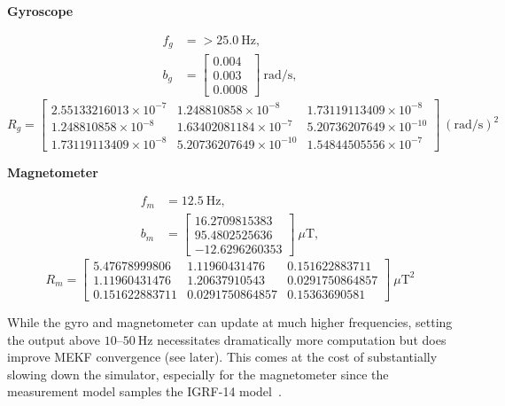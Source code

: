 \documentclass[conference,onecolumn,draftclsnofoot]{IEEEtran}
\begin{document}
\begin{center}
\textbf{Gyroscope}
\end{center}
\begin{align}
f_g &= > 25.0~\mathrm{Hz}, \\
b_g &=
\begin{bmatrix}
0.004 \\
0.003 \\
0.0008
\end{bmatrix}
~\mathrm{rad/s},
\end{align}
\begin{equation}
R_g =
\begin{bmatrix}
2.55133216013\times 10^{-7} & 1.248810858\times 10^{-8} & 1.73119113409\times 10^{-8} \\
1.248810858\times 10^{-8} & 1.63402081184\times 10^{-7} & 5.20736207649\times 10^{-10} \\
1.73119113409\times 10^{-8} & 5.20736207649\times 10^{-10} & 1.54844505556\times 10^{-7}
\end{bmatrix}
~(\mathrm{rad/s})^2 
\end{equation}


\begin{center}
\textbf{Magnetometer}
\end{center}
\begin{align}f_m &= 12.5~\mathrm{Hz}, \\
b_m &=
\begin{bmatrix}
16.2709815383 \\
95.4802525636 \\
-12.6296260353
\end{bmatrix}
~\mu\mathrm{T},
\end{align}
\begin{equation}
R_m =
\begin{bmatrix}
5.47678999806 & 1.11960431476 & 0.151622883711 \\
1.11960431476 & 1.20637910543 & 0.0291750864857 \\
0.151622883711 & 0.0291750864857 & 0.15363690581
\end{bmatrix}
~\mu\mathrm{T}^2 
\end{equation}

While the gyro and magnetometer can update at much higher frequencies, setting the output above $10$--$50~\mathrm{Hz}$ necessitates dramatically more computation but does improve MEKF convergence (see later). This comes at the cost of substantially slowing down the simulator, especially for the magnetometer since the measurement model samples the IGRF-14 model~\cite{iaga2024igrf14}.
\end{document}
